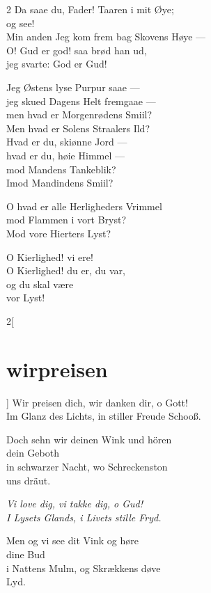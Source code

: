 \documentclass[shorttitlesize=45,tocstyle=ref]{ees}
\begin{document}
{\begin{multicols}{2}
Da saae du, Fader! Taaren i mit Øye;\\
og see!\\
Min anden Jeg kom frem bag Skovens Høye —\\
O! Gud er god! saa brød han ud,\\
jeg svarte: God er Gud!

Jeg Østens lyse Purpur saae —\\
jeg skued Dagens Helt fremgaae —\\
men hvad er Morgenrødens Smiil?\\
Men hvad er Solens Straalers Ild?\\
Hvad er du, skiønne Jord —\\
hvad er du, høie Himmel —\\
mod Mandens Tankeblik?\\
Imod Mandindens Smiil?

O hvad er alle Herligheders Vrimmel\\
mod Flammen i vort Bryst?\\
Mod vore Hierters Lyst?

O Kierlighed! vi ere!\\
O Kierlighed! du er, du var,\\
og du skal være\\
vor Lyst!
\end{multicols}


\begin{multicols}{2}[\section{wirpreisen}]
Wir preisen dich, wir danken dir, o Gott!\\
Im Glanz des Lichts, in stiller Freude Schooß.

Doch sehn wir deinen Wink und hören\\
\hspace*{1em}dein Geboth\\
in schwarzer Nacht, wo Schreckenston\\
\hspace*{1em}uns dräut.

\columnbreak\itshape
Vi love dig, vi takke dig, o Gud!\\
I Lysets Glands, i Livets stille Fryd.

Men og vi see dit Vink og høre\\
\hspace*{1em}dine Bud\\
i Nattens Mulm, og Skrækkens døve\\
\hspace*{1em}Lyd.
\end{multicols}

}
\end{document}
